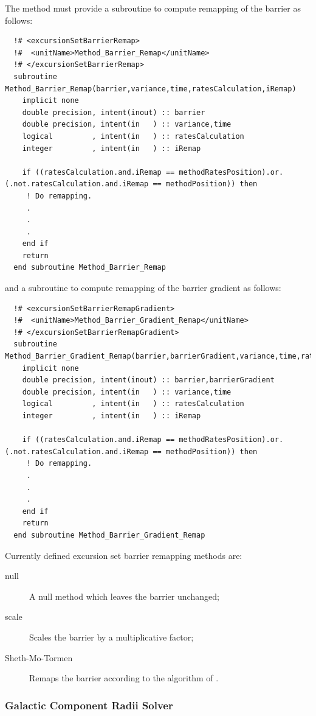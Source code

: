 The method must provide a subroutine to compute remapping of the barrier as follows:
\begin{verbatim}
  !# <excursionSetBarrierRemap>
  !#  <unitName>Method_Barrier_Remap</unitName>
  !# </excursionSetBarrierRemap>
  subroutine Method_Barrier_Remap(barrier,variance,time,ratesCalculation,iRemap)
    implicit none
    double precision, intent(inout) :: barrier
    double precision, intent(in   ) :: variance,time
    logical         , intent(in   ) :: ratesCalculation
    integer         , intent(in   ) :: iRemap

    if ((ratesCalculation.and.iRemap == methodRatesPosition).or.(.not.ratesCalculation.and.iRemap == methodPosition)) then
     ! Do remapping.
     .
     .
     .
    end if
    return
  end subroutine Method_Barrier_Remap
\end{verbatim}
and a subroutine to compute remapping of the barrier gradient as follows:
\begin{verbatim}
  !# <excursionSetBarrierRemapGradient>
  !#  <unitName>Method_Barrier_Gradient_Remap</unitName>
  !# </excursionSetBarrierRemapGradient>
  subroutine Method_Barrier_Gradient_Remap(barrier,barrierGradient,variance,time,ratesCalculation,iRemap)
    implicit none
    double precision, intent(inout) :: barrier,barrierGradient
    double precision, intent(in   ) :: variance,time
    logical         , intent(in   ) :: ratesCalculation
    integer         , intent(in   ) :: iRemap

    if ((ratesCalculation.and.iRemap == methodRatesPosition).or.(.not.ratesCalculation.and.iRemap == methodPosition)) then
     ! Do remapping.
     .
     .
     .
    end if
    return
  end subroutine Method_Barrier_Gradient_Remap
\end{verbatim}

Currently defined excursion set barrier remapping methods are:
\begin{description}
 \item [{\normalfont \ttfamily null}] A null method which leaves the barrier unchanged;
 \item [{\normalfont \ttfamily scale}] Scales the barrier by a multiplicative factor;
 \item [{\normalfont \ttfamily Sheth-Mo-Tormen}] Remaps the barrier according to the algorithm of \cite{sheth_ellipsoidal_2001}.
\end{description}

\subsubsection{Galactic Component Radii Solver}\label{sec:galactic_radii_solvers}

